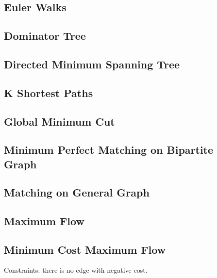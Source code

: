 \documentclass{article}
\begin{document}
\begin{multicols}{2}
    \subsection{Euler Walks}
    

    \subsection{Dominator Tree}
    

    \subsection{Directed Minimum Spanning Tree}
    

    \subsection{K Shortest Paths}
    

    \subsection{Global Minimum Cut}
    

    \subsection{Minimum Perfect Matching on Bipartite Graph}
    

    \subsection{Matching on General Graph}
    

    \subsection{Maximum Flow}
    

    \subsection{Minimum Cost Maximum Flow}
    Constraints: there is no edge with negative cost.
    


\end{multicols}
\end{document}

